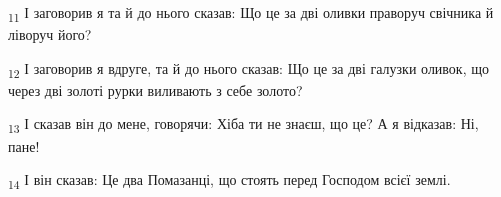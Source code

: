 \begin{tcolorbox}
\textsubscript{11} І заговорив я та й до нього сказав: Що це за дві оливки праворуч свічника й ліворуч його?
\end{tcolorbox}
\begin{tcolorbox}
\textsubscript{12} І заговорив я вдруге, та й до нього сказав: Що це за дві галузки оливок, що через дві золоті рурки виливають з себе золото?
\end{tcolorbox}
\begin{tcolorbox}
\textsubscript{13} І сказав він до мене, говорячи: Хіба ти не знаєш, що це? А я відказав: Ні, пане!
\end{tcolorbox}
\begin{tcolorbox}
\textsubscript{14} І він сказав: Це два Помазанці, що стоять перед Господом всієї землі.
\end{tcolorbox}
